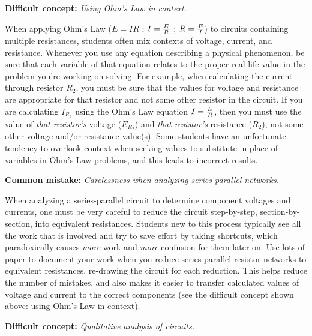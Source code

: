 \vskip 10pt

\noindent
{\bf Difficult concept: } {\it Using Ohm's Law in context.}

When applying Ohm's Law ($E = IR$ ; $I = {E \over R}$ ; $R = {E \over I}$) to circuits containing multiple resistances, students often mix contexts of voltage, current, and resistance.  Whenever you use any equation describing a physical phenomenon, be sure that each variable of that equation relates to the proper real-life value in the problem you're working on solving.  For example, when calculating the current through resistor $R_2$, you must be sure that the values for voltage and resistance are appropriate for that resistor and not some other resistor in the circuit.  If you are calculating $I_{R_2}$ using the Ohm's Law equation $I = {E \over R}$, then you must use the value of {\it that resistor's} voltage ($E_{R_2}$) and {\it that resistor's} resistance ($R_2$), not some other voltage and/or resistance value(s).  Some students have an unfortunate tendency to overlook context when seeking values to substitute in place of variables in Ohm's Law problems, and this leads to incorrect results.

\vskip 10pt

\noindent
{\bf Common mistake: } {\it Carelessness when analyzing series-parallel networks.}

When analyzing a series-parallel circuit to determine component voltages and currents, one must be very careful to reduce the circuit step-by-step, section-by-section, into equivalent resistances.  Students new to this process typically see all the work that is involved and try to save effort by taking shortcuts, which paradoxically causes {\it more} work and {\it more} confusion for them later on.  Use lots of paper to document your work when you reduce series-parallel resistor networks to equivalent resistances, re-drawing the circuit for each reduction.  This helps reduce the number of mistakes, and also makes it easier to transfer calculated values of voltage and current to the correct components (see the difficult concept shown above: using Ohm's Law in context).

\vskip 10pt

\noindent
{\bf Difficult concept: } {\it Qualitative analysis of circuits.}

